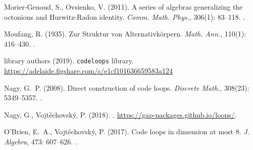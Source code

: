 \documentclass{article}
\theoremstyle{plain}
\theoremstyle{definition}
\begin{document}
\begin{thebibliography}{10}
Morier-Genoud, S., Ovsienko, V. (2011).
\newblock A series of algebras generalizing the octonions and {H}urwitz-{R}adon
  identity.
\newblock \emph{Comm. Math. Phys.}, 306(1): 83--118.
\newblock {}.

Moufang, R. (1935).
\newblock Zur {S}truktur von {A}lternativk\"{o}rpern.
\newblock \emph{Math. Ann.}, 110(1): 416--430.
\newblock {}.

{library authors} (2019).
\newblock \texttt{codeloops} library.
\newblock \url{https://adelaide.figshare.com/s/e1cf101636659583a124} 

Nagy, G.~P. (2008).
\newblock Direct construction of code loops.
\newblock \emph{Discrete Math.}, 308(23): 5349--5357.
\newblock {}.

Nagy, G., Vojt\v{e}chovsk\'{y}, P. (2018).
.
\newblock \url{https://gap-packages.github.io/loops/}.

O'Brien, E.~A., Vojt\v{e}chovsk\'{y}, P. (2017).
\newblock Code loops in dimension at most 8.
\newblock \emph{J. Algebra}, 473: 607--626.
\newblock {}.



\end{thebibliography}



\vfill\eject
\end{document}
